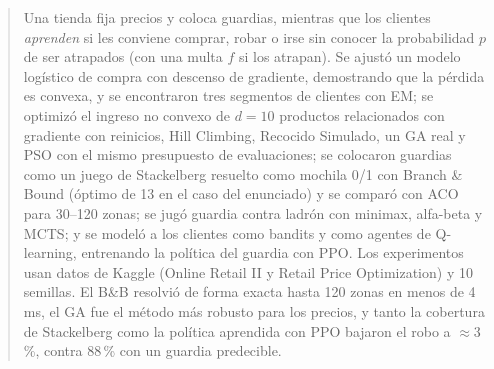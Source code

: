 %

\begingroup
\renewcommand{\figurename}{Figura}
\renewcommand{\tablename}{Tabla}
\algrenewcommand{}
\algrenewcommand{}
\algrenewcommand{}
\algrenewcommand{}
\algrenewcommand{}
\algrenewcommand{}
\algrenewcommand{}
\algrenewcommand{}
\algrenewcommand{}
\sloppy

\begin{abstract}
\noindent
Una tienda fija precios y coloca guardias, mientras que los clientes \emph{aprenden} si les conviene comprar, robar o irse sin conocer la probabilidad $p$ de ser atrapados (con una multa $f$ si los atrapan). Se ajustó un modelo logístico de compra con descenso de gradiente, demostrando que la pérdida es convexa, y se encontraron tres segmentos de clientes con EM; se optimizó el ingreso no convexo de $d=10$ productos relacionados con gradiente con reinicios, Hill Climbing, Recocido Simulado, un GA real y PSO con el mismo presupuesto de evaluaciones; se colocaron guardias como un juego de Stackelberg resuelto como mochila 0/1 con Branch \& Bound (óptimo de 13 en el caso del enunciado) y se comparó con ACO para 30--120 zonas; se jugó guardia contra ladrón con minimax, alfa-beta y MCTS; y se modeló a los clientes como bandits y como agentes de Q-learning, entrenando la política del guardia con PPO. Los experimentos usan datos de Kaggle (Online Retail II y Retail Price Optimization) y 10 semillas. El B\&B resolvió de forma exacta hasta 120 zonas en menos de 4 ms, el GA fue el método más robusto para los precios, y tanto la cobertura de Stackelberg como la política aprendida con PPO bajaron el robo a $\approx$3\,\%, contra 88\,\% con un guardia predecible.
\end{abstract}

